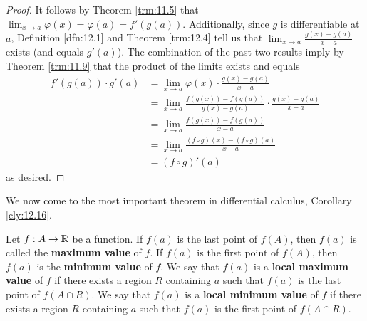 \documentclass[../main.tex]{subfiles}
\begin{document}
\begin{theorem}
\begin{proof}
        It follows by Theorem \ref{trm:11.5} that $\lim_{x\to a}\varphi(x)=\varphi(a)=f'(g(a))$. Additionally, since $g$ is differentiable at $a$, Definition \ref{dfn:12.1} and Theorem \ref{trm:12.4} tell us that $\lim_{x\to a}\frac{g(x)-g(a)}{x-a}$ exists (and equals $g'(a)$). The combination of the past two results imply by Theorem \ref{trm:11.9} that the product of the limits exists and equals
        \begin{align*}
            f'(g(a))\cdot g'(a) &= \lim_{x\to a}\varphi(x)\cdot\frac{g(x)-g(a)}{x-a}\\
            &= \lim_{x\to a}\frac{f(g(x))-f(g(a))}{g(x)-g(a)}\cdot\frac{g(x)-g(a)}{x-a}\\
            &= \lim_{x\to a}\frac{f(g(x))-f(g(a))}{x-a}\\
            &= \lim_{x\to a}\frac{(f\circ g)(x)-(f\circ g)(a)}{x-a}\\
            &= (f\circ g)'(a)
        \end{align*}
        as desired.
    \end{proof}
\end{theorem}

We now come to the most important theorem in differential calculus, Corollary \ref{cly:12.16}.

\begin{definition}\label{dfn:12.11}
    Let $f:A\to\mathbb{R}$ be a function. If $f(a)$ is the last point of $f(A)$, then $f(a)$ is called the \textbf{maximum value} of $f$. If $f(a)$ is the first point of $f(A)$, then $f(a)$ is the \textbf{minimum value} of $f$. We say that $f(a)$ is a \textbf{local maximum value} of $f$ if there exists a region $R$ containing $a$ such that $f(a)$ is the last point of $f(A\cap R)$. We say that $f(a)$ is a \textbf{local minimum value} of $f$ if there exists a region $R$ containing $a$ such that $f(a)$ is the first point of $f(A\cap R)$.
\end{definition}
\end{document}
